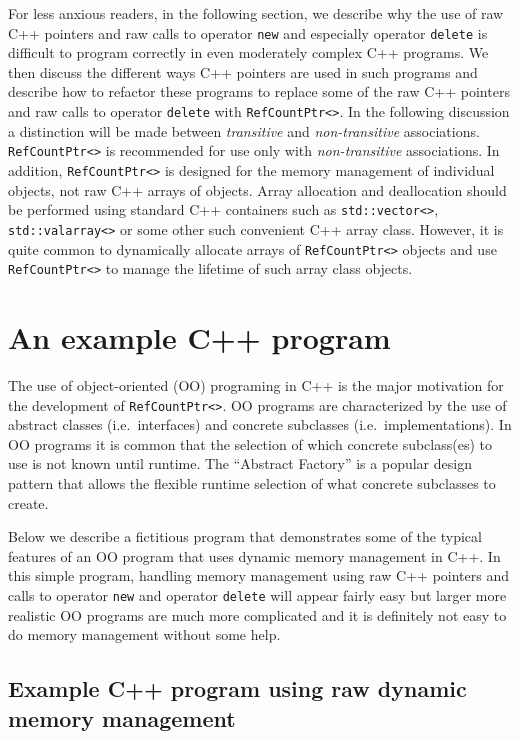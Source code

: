 \documentclass[pdf,ps2pdf,11pt]{SANDreport}
\begin{document}
For less anxious readers, in the following section, we describe why
the use of raw C++ pointers and raw calls to operator {}\texttt{new}
and especially operator {}\texttt{delete} is difficult to program
correctly in even moderately complex C++ programs.  We then discuss
the different ways C++ pointers are used in such programs and describe
how to refactor these programs to replace some of the raw C++ pointers
and raw calls to operator {}\texttt{delete} with
{}\texttt{Ref\-Count\-Ptr<>}.  In the following discussion a
distinction will be made between {}\textit{transitive} and
{}\textit{non-transitive} associations.  {}\texttt{Ref\-Count\-Ptr<>}
is recommended for use only with {}\textit{non-transitive}
associations.  In addition, {}\texttt{Ref\-Count\-Ptr<>} is designed
for the memory management of individual objects, not raw C++ arrays of
objects.  Array allocation and deallocation should be performed using
standard C++ containers such as {}\texttt{std\-::vector<>},
{}\texttt{std\-::valarray<>} or some other such convenient C++ array
class.  However, it is quite common to dynamically allocate arrays of
{}\texttt{Ref\-Count\-Ptr<>} objects and use
{}\texttt{Ref\-Count\-Ptr<>} to manage the lifetime of such array
class objects.

%
\section{An example C++ program}
%

The use of object-oriented (OO) programing in C++ is the major
motivation for the development of {}\texttt{Ref\-Count\-Ptr<>}.  OO
programs are characterized by the use of abstract classes
(i.e.~interfaces) and concrete subclasses (i.e.~implementations).  In
OO programs it is common that the selection of which concrete
subclass(es) to use is not known until runtime.  The ``Abstract
Factory'' {}\cite{ref:gama_et_al_1995} is a popular design pattern
that allows the flexible runtime selection of what concrete subclasses
to create.

Below we describe a fictitious program that demonstrates some of the
typical features of an OO program that uses dynamic memory management
in C++.  In this simple program, handling memory management using raw
C++ pointers and calls to operator {}\texttt{new} and operator
{}\texttt{delete} will appear fairly easy but larger more realistic OO
programs are much more complicated and it is definitely not easy to do
memory management without some help.

%
\subsection{Example C++ program using raw dynamic memory management}
\label{rcpbg:sec:original-program}
%
\end{document}
